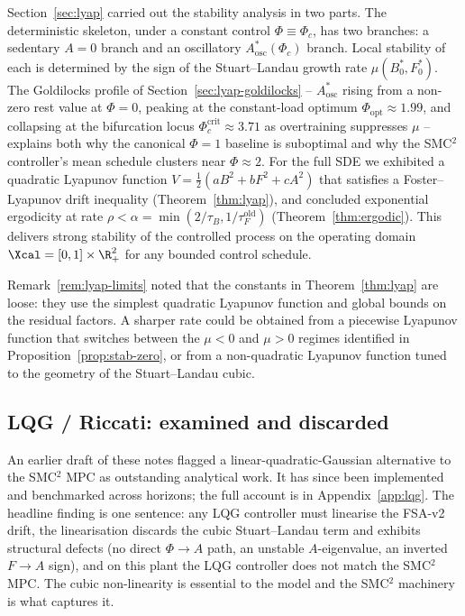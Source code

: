 Section~\ref{sec:lyap} carried out the stability analysis in two
parts. The deterministic skeleton, under a constant control
$\Phi \equiv \Phi_c$, has two branches: a sedentary $A=0$ branch and
an oscillatory $A^*_{\mathrm{osc}}(\Phi_c)$ branch. Local stability of
each is determined by the sign of the Stuart--Landau growth rate
$\mu(B^*_0,F^*_0)$. The Goldilocks profile of
Section~\ref{sec:lyap-goldilocks} -- $A^*_{\mathrm{osc}}$ rising
from a non-zero rest value at $\Phi=0$, peaking at the constant-load
optimum $\Phi_{\mathrm{opt}} \approx 1.99$, and collapsing at the
bifurcation locus $\Phi_c^{\mathrm{crit}} \approx 3.71$ as
overtraining suppresses $\mu$ -- explains both why the canonical
$\Phi=1$ baseline is suboptimal and why the SMC${}^2$ controller's
mean schedule clusters near $\Phi \approx 2$. For the full
SDE we exhibited a quadratic Lyapunov function
$V = \tfrac12(aB^2+bF^2+cA^2)$ that satisfies a Foster--Lyapunov drift
inequality (Theorem~\ref{thm:lyap}), and concluded exponential
ergodicity at rate
$\rho < \alpha = \min(2/\tau_B,1/\tau_F^{\mathrm{old}})$
(Theorem~\ref{thm:ergodic}). This delivers strong stability of the
controlled process on the operating domain
$\Xcal = [0,1]\times\R_+^2$ for any bounded control schedule.

Remark~\ref{rem:lyap-limits} noted that the constants in
Theorem~\ref{thm:lyap} are loose: they use the simplest quadratic
Lyapunov function and global bounds on the residual factors. A
sharper rate could be obtained from a piecewise Lyapunov function
that switches between the $\mu < 0$ and $\mu > 0$ regimes identified
in Proposition~\ref{prop:stab-zero}, or from a non-quadratic Lyapunov
function tuned to the geometry of the Stuart--Landau cubic.

\subsection{LQG / Riccati: examined and discarded}\label{sec:discussion-lqg-pointer}

An earlier draft of these notes flagged a linear-quadratic-Gaussian
alternative to the SMC${}^2$ MPC as outstanding analytical work. It
has since been implemented and benchmarked across horizons; the full
account is in Appendix~\ref{app:lqg}. The headline finding is one
sentence: any LQG controller must linearise the FSA-v2 drift, the
linearisation discards the cubic Stuart--Landau term and exhibits
structural defects (no direct $\Phi\!\to\!A$ path, an unstable
$A$-eigenvalue, an inverted $F\!\to\!A$ sign), and on this plant the
LQG controller does not match the SMC${}^2$ MPC. The cubic
non-linearity is essential to the model and the SMC${}^2$ machinery
is what captures it.


